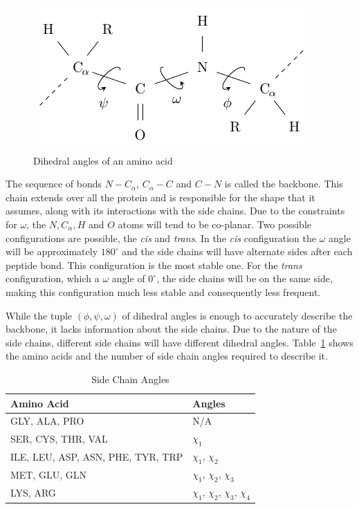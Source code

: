 \begin{figure}
    \centering
    \includegraphics[width=0.7\linewidth]{Figuras/angles.pdf}
    \caption{Dihedral angles of an amino acid}
    \label{fig:angles}
\end{figure}

The sequence of bonds $N - C_\alpha$, $C_\alpha - C$ and $C - N$ is called the
backbone. This chain extends over all the protein and is responsible for the
shape that it assumes, along with its interactions with the side chains. Due to
the constraints for $\omega$, the $N, C_\alpha, H$ and $O$ atoms will tend to
be co-planar. Two possible configurations are possible, the \textit{cis} and
\textit{trans}. In the \textit{cis} configuration the $\omega$ angle will be
approximately $180^\circ$ and the side chains will have alternate sides after
each peptide bond. This configuration is the most stable one. For the
\textit{trans} configuration, which a $\omega$ angle of $0^\circ$, the side
chains will be on the same side, making this configuration much less stable and
consequently less frequent.

While the tuple $(\phi, \psi, \omega)$ of dihedral angles is enough to
accurately describe the backbone, it lacks information about the side chains.
Due to the nature of the side chains, different side chains will have different
dihedral angles. Table~\ref{tab:side-chain-angles} shows the amino acids and
the number of side chain angles required to describe it.

\begin{table}[]
    \centering
    \begin{tabular}{l|l} \hline \hline
        Amino Acid & Angles \\ \hline \hline
        GLY, ALA, PRO & N/A \\
        SER, CYS, THR, VAL & $\chi_1$ \\
        ILE, LEU, ASP, ASN, PHE, TYR, TRP & $\chi_1$, $\chi_2$ \\
        MET, GLU, GLN & $\chi_1$, $\chi_2$, $\chi_3$ \\
        LYS, ARG & $\chi_1$, $\chi_2$, $\chi_3$, $\chi_4$ \\
        \hline \hline
    \end{tabular}
    \caption{Side Chain Angles}
    \label{tab:side-chain-angles}
\end{table}


